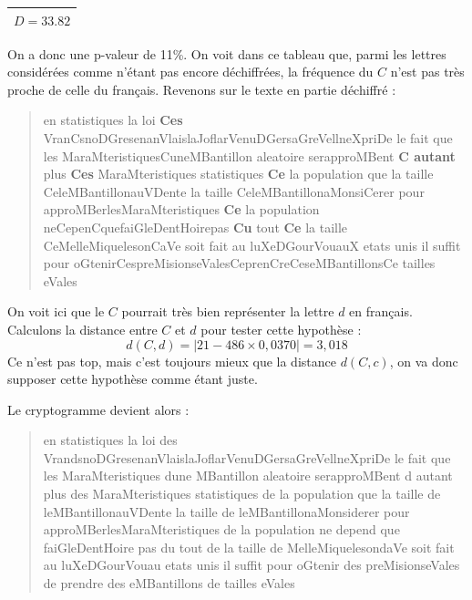 \documentclass[a4paper, titlepage]{livret}
\begin{document}
\begin{center}
\begin{tabular}{|c|}
\hline
\textbf{$D = 33.82$}\\
\hline
\end{tabular}
\label{tab10}
\end{center}

On a donc une p-valeur de 11\%.
On voit dans ce tableau que, parmi les lettres considérées comme n'étant pas encore déchiffrées, la fréquence du $C$ n'est pas très proche de celle du français.
Revenons sur le texte en partie déchiffré :

\begin{center}
\begin{quote}
\og en statistiques la loi \textbf{Ces} VranCsnoDGresenanVlaislaJoflarVenuDGersaGreVellneXpriDe le fait que les MaraMteristiquesCuneMBantillon aleatoire serapproMBent \textbf{C autant} plus \textbf{Ces} MaraMteristiques statistiques \textbf{Ce} la population que la taille CeleMBantillonauVDente la taille CeleMBantillonaMonsiCerer pour approMBerlesMaraMteristiques \textbf{Ce} la population neCepenCquefaiGleDentHoirepas \textbf{Cu} tout \textbf{Ce} la taille CeMelleMiquelesonCaVe soit fait au luXeDGourVouauX etats unis il suffit pour oGtenirCespreMisionseValesCeprenCreCeseMBantillonsCe tailles eVales \fg{}
\end{quote}
\end{center}

On voit ici que le $C$ pourrait très bien représenter la lettre $d$ en français.
Calculons la distance entre $C$ et $d$ pour tester cette hypothèse :
\[ d(C,d) = |21 - 486\times0,0370| = 3,018 \]
Ce n'est pas top, mais c'est toujours mieux que la distance $d(C,c)$, on va donc supposer cette hypothèse comme étant juste.

Le cryptogramme devient alors :

\begin{center}
\begin{quote}
\og en statistiques la loi des VrandsnoDGresenanVlaislaJoflarVenuDGersaGreVellneXpriDe le fait que les MaraMteristiques dune MBantillon aleatoire serapproMBent d autant plus des MaraMteristiques statistiques de la population que la taille de leMBantillonauVDente la taille de leMBantillonaMonsiderer pour approMBerlesMaraMteristiques de la population ne depend que faiGleDentHoire pas du tout de la taille de MelleMiquelesondaVe soit fait au luXeDGourVouau etats unis il suffit pour oGtenir des preMisionseVales de prendre des eMBantillons de tailles eVales \fg{}
\end{quote}
\end{center}
\end{document}
